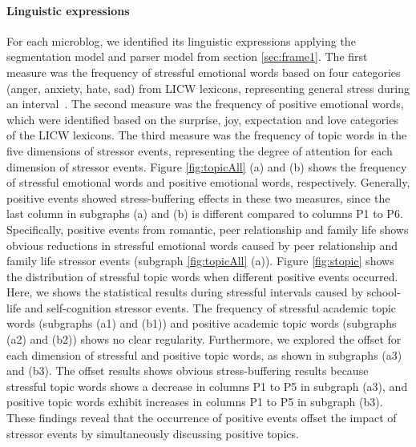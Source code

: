 \paragraph{\textbf{Linguistic expressions}}
For each microblog, we identified its linguistic expressions
applying the segmentation model and parser model from section \ref{sec:frame1}. 
The first measure was the frequency of stressful emotional words based on four categories 
(anger, anxiety, hate, sad) from LICW lexicons, representing general stress during an interval~\citep{Tausczik2010The}.
The second measure was the frequency of positive emotional words, 
which were identified based on the surprise, joy, expectation and love categories of the LICW lexicons.
The third measure was the frequency of topic words in the five dimensions of stressor events,
representing the degree of attention for each dimension of stressor events.
Figure \ref{fig:topicAll} (a) and (b) shows the frequency of stressful emotional words and positive emotional words, respectively.
Generally, positive events showed stress-buffering effects in these two measures,
since the last column in subgraphs (a) and (b) is different compared to columns P1 to P6. 
Specifically, positive events from romantic, peer relationship and family life shows obvious 
reductions in stressful emotional words caused by 
peer relationship and family life stressor events (subgraph \ref{fig:topicAll} (a)).
Figure \ref{fig:stopic} shows the distribution of stressful topic words when different positive events occurred. 
Here, we shows the statistical results during stressful intervals caused by school-life and self-cognition stressor events. 
The frequency of stressful academic topic words (subgraphs (a1) and (b1)) 
and positive academic topic words (subgraphs (a2) and (b2)) shows no clear regularity. 
Furthermore, we explored the offset for each dimension of stressful and positive topic words, 
as shown in subgraphs (a3) and (b3). 
The offset results shows obvious stress-buffering results 
because stressful topic words shows a decrease in columns P1 to P5 in subgraph (a3), 
and positive topic words exhibit increases in columns P1 to P5 in subgraph (b3).
These findings reveal that the occurrence of positive events offset the impact of stressor events 
by simultaneously discussing positive topics. 

